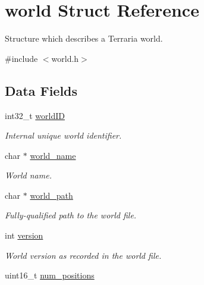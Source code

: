 \hypertarget{structworld}{}\section{world Struct Reference}
\label{structworld}


Structure which describes a Terraria world.  




{\ttfamily \#include $<$world.\+h$>$}

\subsection*{Data Fields}
\begin{DoxyCompactItemize}
\item 
\hypertarget{structworld_adc7c357962feffb5e5c3e8cf97afb257}{}int32\+\_\+t \hyperlink{structworld_adc7c357962feffb5e5c3e8cf97afb257}{world\+I\+D}\label{structworld_adc7c357962feffb5e5c3e8cf97afb257}

\begin{DoxyCompactList}\small\item\em Internal unique world identifier. \end{DoxyCompactList}\item 
\hypertarget{structworld_ab7572eb61250ad0cbb88041676aa8203}{}char $\ast$ \hyperlink{structworld_ab7572eb61250ad0cbb88041676aa8203}{world\+\_\+name}\label{structworld_ab7572eb61250ad0cbb88041676aa8203}

\begin{DoxyCompactList}\small\item\em World name. \end{DoxyCompactList}\item 
\hypertarget{structworld_adfdb7b8c055d1909396c6136e7ba5a2a}{}char $\ast$ \hyperlink{structworld_adfdb7b8c055d1909396c6136e7ba5a2a}{world\+\_\+path}\label{structworld_adfdb7b8c055d1909396c6136e7ba5a2a}

\begin{DoxyCompactList}\small\item\em Fully-\/qualified path to the world file. \end{DoxyCompactList}\item 
\hypertarget{structworld_a9fd0a430065296ebceb4b471a38825a3}{}int \hyperlink{structworld_a9fd0a430065296ebceb4b471a38825a3}{version}\label{structworld_a9fd0a430065296ebceb4b471a38825a3}

\begin{DoxyCompactList}\small\item\em World version as recorded in the world file. \end{DoxyCompactList}\item 
\hypertarget{structworld_afff4585b8422e4b8082e5f67164ee528}{}uint16\+\_\+t \hyperlink{structworld_afff4585b8422e4b8082e5f67164ee528}{num\+\_\+positions}\label{structworld_afff4585b8422e4b8082e5f67164ee528}


\end{DoxyCompactItemize}
